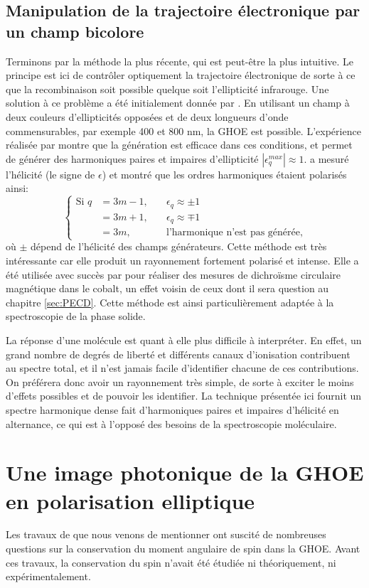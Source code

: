 \subsection{Manipulation de la trajectoire électronique par un champ bicolore}
Terminons par la méthode la plus récente, qui est peut-être la plus intuitive. Le principe est ici de contrôler optiquement la trajectoire électronique de sorte à ce que la recombinaison soit possible quelque soit l'ellipticité infrarouge. Une solution à ce problème a été initialement donnée par . En utilisant un champ à deux couleurs d’ellipticités opposées et de deux longueurs d'onde commensurables, par exemple 400 et 800 nm, la GHOE est possible. L'expérience réalisée par  montre que la génération est efficace dans ces conditions, et permet de générer des harmoniques paires et impaires d'ellipticité $|\epsilon^{max}_q|\approx 1$.  a mesuré l'hélicité (le signe de $\epsilon$) et montré que les ordres harmoniques étaient polarisés ainsi:
\[\left\{
\begin{aligned}
  \text{Si }q&=3m-1,\quad &\epsilon_q \approx \pm 1 \\
	&=3m+1, &\epsilon_q \approx \mp 1 \\
	&=3m, &\text{l'harmonique n'est pas générée},
\end{aligned}
\right.\]
où $\pm$ dépend de l'hélicité des champs générateurs. Cette méthode est très intéressante car elle produit un rayonnement fortement polarisé et intense. Elle a été utilisée avec succès par  pour réaliser des mesures de dichroïsme circulaire magnétique dans le cobalt, un effet voisin de ceux dont il sera question au chapitre \ref{sec:PECD}. Cette méthode est ainsi particulièrement adaptée à la spectroscopie de la phase solide.\par
La réponse d'une molécule est quant à elle plus difficile à interpréter. En effet, un grand nombre de degrés de liberté et différents canaux d'ionisation contribuent au spectre total, et il n'est jamais facile d'identifier chacune de ces contributions. 
On préférera donc avoir un rayonnement très simple, de sorte à exciter le moins d'effets possibles et de pouvoir les identifier. La technique présentée ici fournit un spectre harmonique dense fait d'harmoniques paires et impaires d'hélicité en alternance, ce qui est à l'opposé des besoins de la spectroscopie moléculaire.

\section{Une image photonique de la GHOE en polarisation elliptique}
Les travaux de  que nous venons de mentionner ont suscité de nombreuses questions sur la conservation du moment angulaire de spin dans la GHOE. Avant ces travaux, la conservation du spin n'avait été étudiée ni théoriquement, ni expérimentalement.

